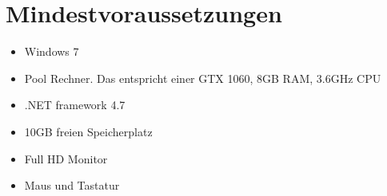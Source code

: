 \section{Mindestvoraussetzungen}

%
%

\begin{itemize}[leftmargin=*, nosep]
    \item Windows 7
    \item Pool Rechner. Das entspricht einer GTX 1060, 8GB RAM, 3.6GHz CPU
    \item .NET framework 4.7
    \item 10GB freien Speicherplatz
    \item Full HD Monitor
    \item Maus und Tastatur
\end{itemize}
